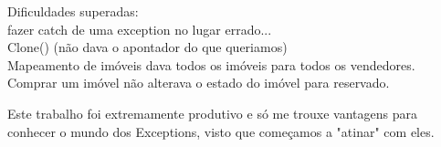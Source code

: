 \documentclass[12pt]{article}
\begin{document}
Dificuldades superadas:
~\\
fazer catch de uma exception no lugar errado...
~\\
Clone() (não dava o apontador do que queriamos)
~\\
Mapeamento de imóveis dava todos os imóveis para todos os vendedores.
~\\
Comprar um imóvel não alterava o estado do imóvel para reservado.


Este trabalho foi extremamente produtivo e só me trouxe vantagens para conhecer o mundo dos Exceptions, visto que começamos a "atinar" com eles.
\end{document}
